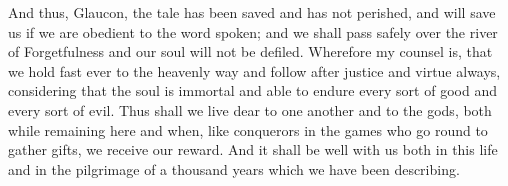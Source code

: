 And thus, Glaucon, the tale has been saved and has not perished, and
will save us if we are obedient to the word spoken; and we shall pass
safely over the river of Forgetfulness and our soul will not be defiled.
Wherefore my counsel is, that we hold fast ever to the heavenly way and
follow after justice and virtue always, considering that the soul is
immortal and able to endure every sort of good and every sort of evil.
Thus shall we live dear to one another and to the gods, both while
remaining here and when, like conquerors in the games who go round to
gather gifts, we receive our reward. And it shall be well with us both
in this life and in the pilgrimage of a thousand years which we have
been describing.



